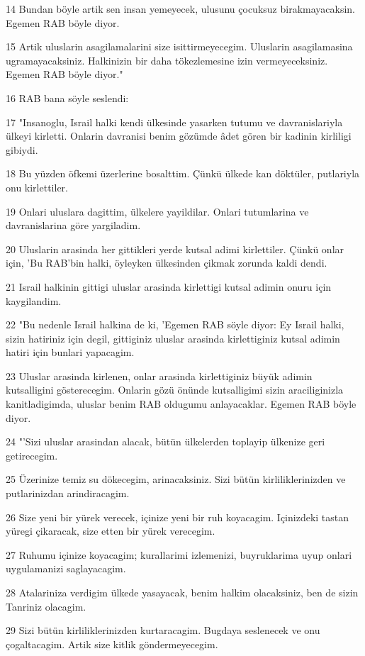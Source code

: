 \par 14 Bundan böyle artik sen insan yemeyecek, ulusunu çocuksuz birakmayacaksin. Egemen RAB böyle diyor.
\par 15 Artik uluslarin asagilamalarini size isittirmeyecegim. Uluslarin asagilamasina ugramayacaksiniz. Halkinizin bir daha tökezlemesine izin vermeyeceksiniz. Egemen RAB böyle diyor."
\par 16 RAB bana söyle seslendi:
\par 17 "Insanoglu, Israil halki kendi ülkesinde yasarken tutumu ve davranislariyla ülkeyi kirletti. Onlarin davranisi benim gözümde âdet gören bir kadinin kirliligi gibiydi.
\par 18 Bu yüzden öfkemi üzerlerine bosalttim. Çünkü ülkede kan döktüler, putlariyla onu kirlettiler.
\par 19 Onlari uluslara dagittim, ülkelere yayildilar. Onlari tutumlarina ve davranislarina göre yargiladim.
\par 20 Uluslarin arasinda her gittikleri yerde kutsal adimi kirlettiler. Çünkü onlar için, 'Bu RAB'bin halki, öyleyken ülkesinden çikmak zorunda kaldi dendi.
\par 21 Israil halkinin gittigi uluslar arasinda kirlettigi kutsal adimin onuru için kaygilandim.
\par 22 "Bu nedenle Israil halkina de ki, 'Egemen RAB söyle diyor: Ey Israil halki, sizin hatiriniz için degil, gittiginiz uluslar arasinda kirlettiginiz kutsal adimin hatiri için bunlari yapacagim.
\par 23 Uluslar arasinda kirlenen, onlar arasinda kirlettiginiz büyük adimin kutsalligini gösterecegim. Onlarin gözü önünde kutsalligimi sizin araciliginizla kanitladigimda, uluslar benim RAB oldugumu anlayacaklar. Egemen RAB böyle diyor.
\par 24 "'Sizi uluslar arasindan alacak, bütün ülkelerden toplayip ülkenize geri getirecegim.
\par 25 Üzerinize temiz su dökecegim, arinacaksiniz. Sizi bütün kirliliklerinizden ve putlarinizdan arindiracagim.
\par 26 Size yeni bir yürek verecek, içinize yeni bir ruh koyacagim. Içinizdeki tastan yüregi çikaracak, size etten bir yürek verecegim.
\par 27 Ruhumu içinize koyacagim; kurallarimi izlemenizi, buyruklarima uyup onlari uygulamanizi saglayacagim.
\par 28 Atalariniza verdigim ülkede yasayacak, benim halkim olacaksiniz, ben de sizin Tanriniz olacagim.
\par 29 Sizi bütün kirliliklerinizden kurtaracagim. Bugdaya seslenecek ve onu çogaltacagim. Artik size kitlik göndermeyecegim.
